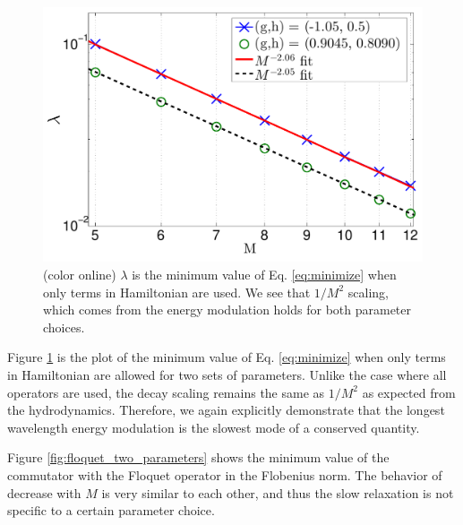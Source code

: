 \documentclass[twocolumn,superscriptaddress, prb]{revtex4-1}
\begin{document}
\begin{figure}
\includegraphics[width=1.0\linewidth]{X_Z_ZZ_only_two_parameters.pdf}
\centering
\caption{(color online) $\lambda$ is the minimum value of Eq. \eqref{eq:minimize} when only terms in Hamiltonian are used. We see that $1/M^2$ scaling, which comes from the energy modulation holds for both parameter choices. }
\label{fig:Ham_only_two_parameters}
\end{figure}
Figure \ref{fig:Ham_only_two_parameters} is the plot of the minimum value of Eq. \eqref{eq:minimize} when only terms in Hamiltonian are allowed
for two sets of parameters. Unlike the case where all operators are used,
the decay scaling remains the same as $1/M^2$ as expected from the hydrodynamics.
Therefore, we again explicitly demonstrate that the longest wavelength energy modulation is the slowest mode of a conserved quantity.



Figure \ref{fig:floquet_two_parameters} shows the minimum value of the commutator with the Floquet operator in the Flobenius norm.
The behavior of decrease with $M$ is very similar to each other, 
and thus the slow relaxation is not specific to a certain parameter choice. 
\end{document}
